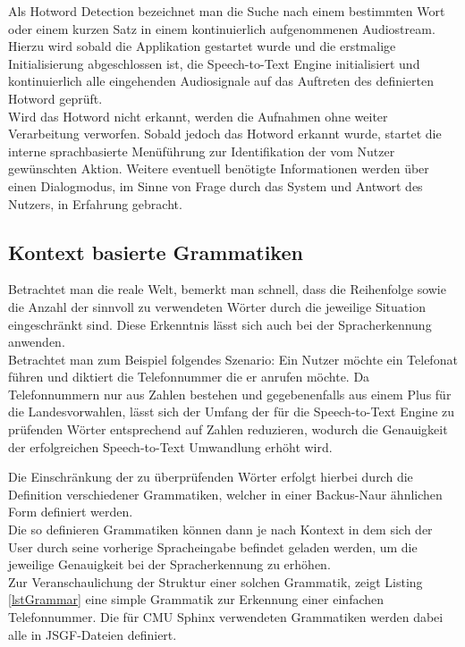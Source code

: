 Als Hotword Detection bezeichnet man die Suche nach einem bestimmten Wort oder einem kurzen Satz in einem kontinuierlich aufgenommenen Audiostream.\\
Hierzu wird sobald die Applikation gestartet wurde und die erstmalige Initialisierung abgeschlossen ist, die Speech-to-Text Engine initialisiert und kontinuierlich alle eingehenden Audiosignale auf das Auftreten des definierten Hotword geprüft.\\
Wird das Hotword nicht erkannt, werden die Aufnahmen ohne weiter Verarbeitung verworfen. Sobald jedoch das Hotword erkannt wurde, startet die interne sprachbasierte Menüführung zur Identifikation der vom Nutzer gewünschten Aktion. Weitere eventuell benötigte Informationen werden über einen Dialogmodus, im Sinne von Frage durch das System und Antwort des Nutzers, in Erfahrung gebracht.

\subsection{Kontext basierte Grammatiken}
Betrachtet man die reale Welt, bemerkt man schnell, dass die Reihenfolge sowie die Anzahl der sinnvoll zu verwendeten Wörter durch die jeweilige Situation eingeschränkt sind. Diese Erkenntnis lässt sich auch bei der Spracherkennung anwenden.\\
Betrachtet man zum Beispiel folgendes Szenario: Ein Nutzer möchte ein Telefonat führen und diktiert die Telefonnummer die er anrufen möchte. Da Telefonnummern nur aus Zahlen bestehen und gegebenenfalls aus einem Plus für die Landesvorwahlen, lässt sich der Umfang der für die Speech-to-Text Engine zu prüfenden Wörter entsprechend auf Zahlen reduzieren, wodurch die Genauigkeit der erfolgreichen Speech-to-Text Umwandlung erhöht wird.

Die Einschränkung der zu überprüfenden Wörter erfolgt hierbei durch die Definition verschiedener Grammatiken, welcher in einer Backus-Naur ähnlichen Form definiert werden.\\
Die so definieren Grammatiken können dann je nach Kontext in dem sich der User durch seine vorherige Spracheingabe befindet geladen werden, um die jeweilige Genauigkeit bei der Spracherkennung zu erhöhen.\\
Zur Veranschaulichung der Struktur einer solchen Grammatik, zeigt Listing \ref{lstGrammar} eine simple Grammatik zur Erkennung einer einfachen Telefonnummer. Die für CMU Sphinx verwendeten Grammatiken werden dabei alle in \ac{JSGF}-Dateien definiert.

